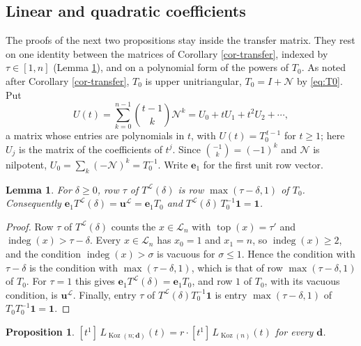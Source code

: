 \documentclass[11pt, a4paper, abstract=yes]{scrartcl}
\theoremstyle{definition}
\theoremstyle{remark}
\theoremstyle{plain}
\newtheorem{lemma}[definition]{Lemma}
\newtheorem{proposition}[definition]{Proposition}
\newcommand{\vek}[1]{\boldsymbol{#1}}
\theoremstyle{remark}
\theoremstyle{plain}
\newcommand{\Koz}{\operatorname{Koz}}
\newcommand{\indeg}{\operatorname{indeg}}
\newcommand{\tp}{\operatorname{top}}
\newcommand{\leandiscof}[1]{\tikz[baseline=-0.6ex]\fill[#1] (0,0) circle (0.6ex);}
\newcommand{\leanfull}{\leandiscof{leanfull}}
\newcommand{\leanmark}[1]{\leavevmode{\reversemarginpar\marginnote{\raggedleft#1}}}
\begin{document}
\subsection{Linear and quadratic coefficients}
\label{sec:org7b21e94}

The proofs of the next two propositions stay inside the transfer matrix. They rest on one identity
between the matrices of Corollary \ref{cor-transfer}, indexed by \(\tau\in[1,n]\) (Lemma
\ref{lem-row-shift}), and on a polynomial form of the powers of \(T_0\). As noted after Corollary
\ref{cor-transfer}, \(T_0\) is upper unitriangular, \(T_0=I+\mathcal N\) by \eqref{eq:T0}. Put
\begin{equation}\label{eq:U}
  U(t)=\sum_{k=0}^{n-1}\binom{t-1}k\mathcal N^k=U_0+tU_1+t^2U_2+\cdots ,
\end{equation}
a matrix whose entries are polynomials in \(t\), with \(U(t)=T_0^{\,t-1}\) for \(t\ge1\); here
\(U_j\) is the matrix of the coefficients of \(t^j\). Since \(\binom{-1}k=(-1)^k\) and \(\mathcal N\)
is nilpotent, \(U_0=\sum_k(-\mathcal N)^k=T_0^{-1}\). Write \(\vek e_1\) for the first unit row
vector.

\begin{lemma}
\leanmark{\leanfull}For \(\delta\ge0\), row \(\tau\) of \(T^{\mathcal L}(\delta)\) is row \(\max(\tau-\delta,1)\) of \(T_0\).
Consequently \(\vek e_1T^{\mathcal L}(\delta)=\vek u^{\mathcal L}=\vek e_1T_0\) and
\(T^{\mathcal L}(\delta)\,T_0^{-1}\vek 1=\vek 1\).
\label{lem-row-shift}
\end{lemma}

\begin{proof}
Row \(\tau\) of \(T^{\mathcal L}(\delta)\) counts the \(x\in\mathcal L_n\) with \(\tp(x)=\tau'\) and
\(\indeg(x)>\tau-\delta\). Every \(x\in\mathcal L_n\) has \(x_0=1\) and \(x_1=n\), so \(\indeg(x)\ge2\),
and the condition \(\indeg(x)>\sigma\) is vacuous for \(\sigma\le1\). Hence the condition with
\(\tau-\delta\) is the condition with \(\max(\tau-\delta,1)\), which is that of row
\(\max(\tau-\delta,1)\) of \(T_0\). For \(\tau=1\) this gives \(\vek e_1T^{\mathcal L}(\delta)=\vek e_1T_0\),
and row \(1\) of \(T_0\), with its vacuous condition, is \(\vek u^{\mathcal L}\). Finally, entry
\(\tau\) of \(T^{\mathcal L}(\delta)T_0^{-1}\vek 1\) is entry \(\max(\tau-\delta,1)\) of
\(T_0T_0^{-1}\vek 1=\vek 1\).
\end{proof}

\begin{proposition}
\leanmark{\leanfull}\([t^1]\,L_{\Koz(n;\vek d)}(t)=r\cdot[t^1]\,L_{\Koz(n)}(t)\) for every \(\vek d\).
\label{prop-linear-coeff}
\end{proposition}
\end{document}
